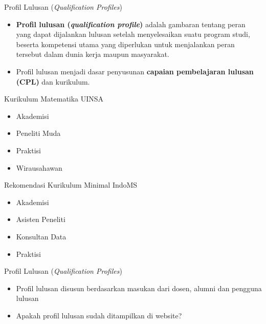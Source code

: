 \documentclass[aspectratio=169,11pt]{beamer}
\begin{document}
\begin{frame}{Profil Lulusan (\textit{Qualification Profiles})}

\begin{itemize}
\item \textbf{Profil lulusan (\textit{qualification profile})} adalah gambaran tentang peran yang dapat dijalankan lulusan setelah menyelesaikan suatu program studi, beserta kompetensi utama yang diperlukan untuk menjalankan peran tersebut dalam dunia kerja maupun masyarakat.
\item Profil lulusan menjadi dasar penyusunan \textbf{capaian pembelajaran lulusan (CPL)} dan kurikulum.
\end{itemize}

\begin{minipage}[t]{0.41\textwidth}
\begin{block}{Kurikulum Matematika UINSA}
\begin{itemize}
\item Akademisi
\item Peneliti Muda
\item Praktisi
\item Wirausahawan
\end{itemize}
\end{block}
\end{minipage}
\hfill
\begin{minipage}[t]{0.55\textwidth}
\begin{block}{Rekomendasi Kurikulum Minimal IndoMS}
\begin{itemize}
\item Akademisi
\item Asisten Peneliti
\item Konsultan Data
\item Praktisi
\end{itemize}
\end{block}
\end{minipage}

\end{frame}

\begin{frame}{Profil Lulusan (\textit{Qualification Profiles})}

\begin{itemize}
\item Profil lulusan disusun berdasarkan masukan dari dosen, alumni dan pengguna lulusan
\item Apakah profil lulusan sudah ditampilkan di website?
\end{itemize}

\end{frame}
\end{document}
